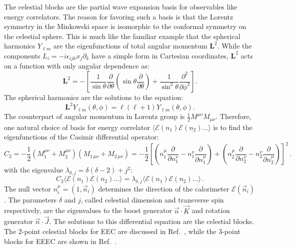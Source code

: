 \documentclass[letterpaper,11pt]{article}
\DeclareRobustCommand{\Ref}[1]{Ref.~\cite{#1}}
\begin{document}
The celestial blocks are the partial wave expansion basis for observables like energy correlators.
%
The reason for favoring such a basis is that the Lorentz symmetry in the Minkowski space is isomorphic to the conformal symmetry on the celestial sphere.
%
This is much like the familiar example that the spherical harmonics $Y_{\ell m}$ are the eigenfunctions of total angular momentum $\mathbf{L}^2$.
%
While the components $L_i=-i\epsilon_{ijk}x_j \partial_k$ have a simple form in Cartesian coordinates, $\mathbf{L}^2$ acts on a function with only angular dependence as:
% 
\begin{equation}
    \mathbf{L}^2=-\left[ \frac{1}{\sin\theta}\frac{\partial}{\partial \theta}\left(\sin\theta \frac{\partial}{\partial\theta}\right)
    +\frac{1}{\sin^2\theta}\frac{\partial^2}{\partial\phi^2}\right].
\end{equation}
%
The spherical harmonics are the solutions to the equation:
\begin{equation}
    \mathbf{L}^2 Y_{\ell m}(\theta,\phi)=\ell(\ell+1)Y_{\ell m}(\theta,\phi).
\end{equation}
%
The counterpart of angular momentum in Lorentz group is $\frac{1}{2}M^{\mu\nu}M_{\mu\nu}$.
%
Therefore, one natural choice of basis for energy correlator $\langle\mathcal{E}(n_1) \mathcal{E}(n_2) \dots \rangle$ is to find the eigenfunctions of the Casimir differential operator:
%
\begin{equation}
    C_2=-\frac{1}{2}(M_{1}^{\mu \nu}+M_{2}^{\mu\nu})(M_{1\,\mu \nu}+M_{2\,\mu\nu})
    =-\frac{1}{2}\left[\left( n_1^\mu \frac{\partial}{\partial n_1^\nu}-n_1^\nu \frac{\partial}{\partial n_1^\mu}\right) 
    +\left( n_2^\mu \frac{\partial}{\partial n_2^\nu}-n_2^\nu \frac{\partial}{\partial n_2^\mu}\right)\right]^2\,.
\end{equation}
%
with the eigenvalue $\lambda_{\delta,j}=\delta(\delta-2)+j^2$:
%
\begin{equation}
C_2 \langle\mathcal{E}(n_1) \mathcal{E}(n_2) \dots \rangle = \lambda_{\delta,j} \langle\mathcal{E}(n_1) \mathcal{E}(n_2) \dots \rangle\,.
\end{equation}
%
The null vector $n_i^\mu=(1,\vec{n}_i)$ determines the direction of the calorimeter $\mathcal{E}(\vec{n}_i)$.
%
The parameters $\delta$ and $j$, called celestial dimension and transverse spin respectively, are the eigenvalues to the boost generator $\vec{n}\cdot\vec{K}$ and rotation generator $\vec{n}\cdot\vec{J}$.
%
The solutions to this differential equation are the celestial blocks.
%
The 2-point celestial blocks for EEC are discussed in \Ref{Kologlu:2019mfz,Chang:2020qpj}, while the 3-point blocks for EEEC are shown in \Ref{Chang:2022ryc,Chen:2022jhb}. 
\end{document}
